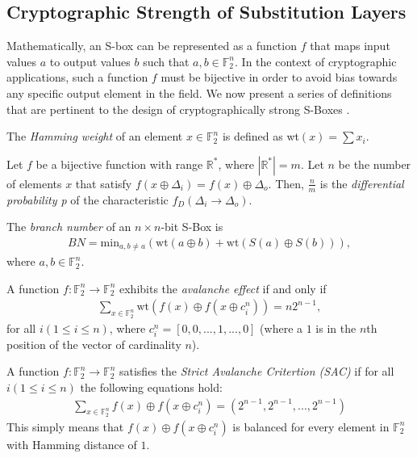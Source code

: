 \documentclass[11pt]{article}
\newcommand{\field}[1]{\mathbb{#1}} %
\begin{document}
\subsection{Cryptographic Strength of Substitution Layers}
Mathematically, an S-box can be represented as a function $f$ that maps input values $a$ to output values $b$ such that $a,b \in \field{F}_2^n$. In the context of cryptographic applications, such a function $f$ must be bijective in order to avoid bias towards any specific output element in the field. We now present a series of definitions that are pertinent to the design of cryptographically strong S-Boxes \cite{Mar_newanalysis}.


\begin{define}
The \emph{Hamming weight} of an element $x \in \field{F}_2^n$ is defined as wt$(x) = \sum x_i$.
\end{define}

\begin{define}
Let $f$ be a bijective function with range $\mathbb{R^*}$, where $|\mathbb{R^*}| = m$. Let $n$ be the number of elements $x$ that satisfy $f(x \oplus \Delta_i) = f(x) \oplus \Delta_o$. Then, $\frac{n}{m}$ is the \emph{differential probability p} of the characteristic $f_D(\Delta_i \to \Delta_o)$.
\end{define}

\begin{define}
The \emph{branch number} of an $n \times n$-bit S-Box is
\begin{eqnarray*}
BN = \text{min}_{a, b\not=a}(\text{wt}(a \oplus b) + \text{wt}(S(a) \oplus S(b))),
\end{eqnarray*}
where $a, b \in \field{F}_2^n$.
\end{define}

\begin{define}
A function $f : \field{F}_2^n \to \field{F}_2^n$ exhibits the \emph{avalanche effect} if and only if 
\begin{eqnarray*}
\sum_{x \in \field{F}_2^n} \text{wt}(f(x) \oplus f(x \oplus c_{i}^{n})) = n2^{n-1},
\end{eqnarray*}
for all $i (1 \leq i \leq n)$, where $c_{i}^{n} = [0, 0, ..., 1, ..., 0]$ (where a $1$ is in the $n$th position of the vector of cardinality $n$).
\end{define}

\begin{define}
A function $f : \field{F}_2^n \to \field{F}_2^n$ satisfies the \emph{Strict Avalanche Critertion (SAC)} if for all $i (1 \leq i \leq n)$ the following equations hold:
\begin{eqnarray*}
\sum_{x \in \field{F}_2^n} f(x) \oplus f(x \oplus c_i^n) = (2^{n-1}, 2^{n-1}, ..., 2^{n-1})
\end{eqnarray*}
This simply means that $f(x) \oplus f(x \oplus c_i^n)$ is balanced for every element in $\field{F}_2^n$ with Hamming distance of $1$. 
\end{define}
\end{document}
